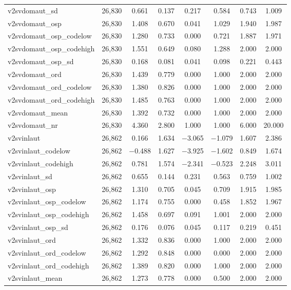 \begin{table}[!htbp]
\begin{tabular}{@{\extracolsep{5pt}}lccccccc}
v2svdomaut\_sd & 26,830 & 0.661 & 0.137 & 0.217 & 0.584 & 0.743 & 1.009 \\ 
v2svdomaut\_osp & 26,830 & 1.408 & 0.670 & 0.041 & 1.029 & 1.940 & 1.987 \\ 
v2svdomaut\_osp\_codelow & 26,830 & 1.280 & 0.733 & 0.000 & 0.721 & 1.887 & 1.971 \\ 
v2svdomaut\_osp\_codehigh & 26,830 & 1.551 & 0.649 & 0.080 & 1.288 & 2.000 & 2.000 \\ 
v2svdomaut\_osp\_sd & 26,830 & 0.168 & 0.081 & 0.041 & 0.098 & 0.221 & 0.443 \\ 
v2svdomaut\_ord & 26,830 & 1.439 & 0.779 & 0.000 & 1.000 & 2.000 & 2.000 \\ 
v2svdomaut\_ord\_codelow & 26,830 & 1.380 & 0.826 & 0.000 & 1.000 & 2.000 & 2.000 \\ 
v2svdomaut\_ord\_codehigh & 26,830 & 1.485 & 0.763 & 0.000 & 1.000 & 2.000 & 2.000 \\ 
v2svdomaut\_mean & 26,830 & 1.392 & 0.732 & 0.000 & 1.000 & 2.000 & 2.000 \\ 
v2svdomaut\_nr & 26,830 & 4.360 & 2.800 & 1.000 & 1.000 & 6.000 & 20.000 \\ 
v2svinlaut & 26,862 & 0.166 & 1.634 & $-$3.065 & $-$1.079 & 1.607 & 2.386 \\ 
v2svinlaut\_codelow & 26,862 & $-$0.488 & 1.627 & $-$3.925 & $-$1.602 & 0.849 & 1.674 \\ 
v2svinlaut\_codehigh & 26,862 & 0.781 & 1.574 & $-$2.341 & $-$0.523 & 2.248 & 3.011 \\ 
v2svinlaut\_sd & 26,862 & 0.655 & 0.144 & 0.231 & 0.563 & 0.759 & 1.002 \\ 
v2svinlaut\_osp & 26,862 & 1.310 & 0.705 & 0.045 & 0.709 & 1.915 & 1.985 \\ 
v2svinlaut\_osp\_codelow & 26,862 & 1.174 & 0.755 & 0.000 & 0.458 & 1.852 & 1.967 \\ 
v2svinlaut\_osp\_codehigh & 26,862 & 1.458 & 0.697 & 0.091 & 1.001 & 2.000 & 2.000 \\ 
v2svinlaut\_osp\_sd & 26,862 & 0.176 & 0.076 & 0.045 & 0.117 & 0.219 & 0.451 \\ 
v2svinlaut\_ord & 26,862 & 1.332 & 0.836 & 0.000 & 1.000 & 2.000 & 2.000 \\ 
v2svinlaut\_ord\_codelow & 26,862 & 1.292 & 0.848 & 0.000 & 0.000 & 2.000 & 2.000 \\ 
v2svinlaut\_ord\_codehigh & 26,862 & 1.389 & 0.820 & 0.000 & 1.000 & 2.000 & 2.000 \\ 
v2svinlaut\_mean & 26,862 & 1.273 & 0.778 & 0.000 & 0.500 & 2.000 & 2.000 \\ 

\end{tabular}
\end{table}
